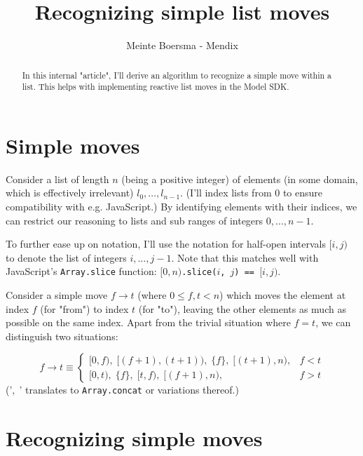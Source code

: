 \documentclass[12pt]{amsart}
\title{Recognizing simple list moves}
\author{Meinte Boersma - Mendix}
\newcommand{\move}[2]{\ensuremath{#1 \rightarrow #2}}
\newcommand{\range}[2]{\ensuremath{[#1, #2)}}
\newcommand{\s}[1]{\ensuremath{\{ #1 \}}}	%
\newcommand{\concat}[0]{\ensuremath{, \;}}
\begin{document}
\begin{abstract}
In this internal "article", I'll derive an algorithm to recognize a simple move within a list.
This helps with implementing reactive list moves in the Model SDK.
\end{abstract}

\maketitle

\section{Simple moves}

Consider a list of length $n$ (being a positive integer) of elements (in some domain, which is effectively irrelevant) $l_0, \ldots, l_{n-1}$.
(I'll index lists from 0 to ensure compatibility with e.g. JavaScript.)
By identifying elements with their indices, we can restrict our reasoning to lists and sub ranges of integers $0, \ldots, n-1$.

To further ease up on notation, I'll use the notation for half-open intervals $\range{i}{j}$ to denote the list of integers $i, \ldots, j-1$.
Note that this matches well with JavaScript's \texttt{Array.slice} function: $\range{0}{n}$\texttt{.slice($i$, $j$) == }$\range{i}{j}$.

Consider a simple move $\move{f}{t}$ (where $0 \leq f, t < n$) which moves the element at index $f$ (for "from") to index $t$ (for "to"), leaving the other elements as much as possible on the same index.
Apart from the trivial situation where $f = t$, we can distinguish two situations:

\begin{equation} \label{simpleMove}
\move{f}{t} \equiv
	\begin{cases}
		\range{0}{f} \concat \range{(f+1)}{(t+1)} \concat \s{f} \concat \range{(t+1)}{n},	& f < t \\
		\range{0}{t} \concat \s{f} \concat \range{t}{f} \concat \range{(f+1)}{n},			& f > t
	\end{cases}
\end{equation}
('$\concat$' translates to \texttt{Array.concat} or variations thereof.)


\section{Recognizing simple moves}
\end{document}
